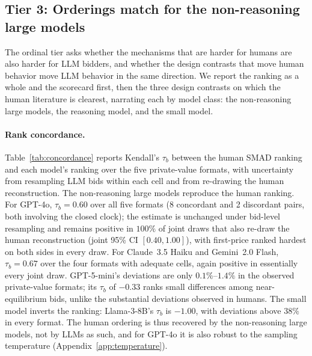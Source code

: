 \documentclass{article} %
\newif\ifmarkrev
\newcommand{\rev}[1]{\ifmarkrev\begingroup\color{red}#1\endgroup\else#1\fi}
\begin{document}
\subsection{\texorpdfstring{\rev{Tier 3: Orderings match for the non-reasoning large models}}{Tier 3: Orderings match for the non-reasoning large models}}\label{sec:tier_orderings}

\rev{The ordinal tier asks whether the mechanisms that are harder for humans are also harder for LLM bidders, and whether the design contrasts that move human behavior move LLM behavior in the same direction. We report the ranking as a whole and the scorecard first, then the three design contrasts on which the human literature is clearest, narrating each by model class: the non-reasoning large models, the reasoning model, and the small model.}

\paragraph{\rev{Rank concordance.}}
\rev{Table~\ref{tab:concordance} reports Kendall's $\tau_b$ between the human SMAD ranking and each model's ranking over the five private-value formats, with uncertainty from resampling LLM bids within each cell and from re-drawing the human reconstruction. The non-reasoning large models reproduce the human ranking. For GPT-4o, $\tau_b = 0.60$ over all five formats (8 concordant and 2 discordant pairs, both involving the closed clock); the estimate is unchanged under bid-level resampling and remains positive in $100\%$ of joint draws that also re-draw the human reconstruction (joint 95\% CI $[0.40, 1.00]$), with first-price ranked hardest on both sides in every draw. For Claude~3.5 Haiku and Gemini~2.0 Flash, $\tau_b = 0.67$ over the four formats with adequate cells, again positive in essentially every joint draw. GPT-5-mini's deviations are only $0.1\%$--$1.4\%$ in the observed private-value formats; its $\tau_b$ of $-0.33$ ranks small differences among near-equilibrium bids, unlike the substantial deviations observed in humans. The small model inverts the ranking: Llama-3-8B's $\tau_b$ is $-1.00$, with deviations above $38\%$ in every format. The human ordering is thus recovered by the non-reasoning large models, not by LLMs as such, and for GPT-4o it is also robust to the sampling temperature (Appendix~\ref{app:temperature}).}

\begin{table}[htbp]
\centering
\small
\rev{\resizebox{\linewidth}{!}{}}
\caption{\rev{Kendall's $\tau_b$ between the human and each model's SMAD ranking over the private-value formats, with joint 95\% bootstrap intervals over LLM bid resampling and human reconstruction re-draws ($B=2000$). GPT-5-mini's clock cells record no bids (Table~\ref{tab:model_comparison}) and are excluded.}}
\label{tab:concordance}
\end{table}
\end{document}
